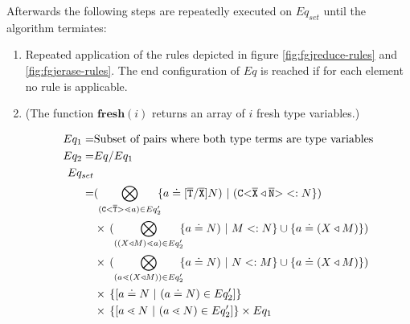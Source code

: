 \documentclass[runningheads]{llncs}
\begin{document}
Afterwards the following steps are repeatedly executed on $Eq_{set}$ until the algorithm termiates:

\begin{enumerate}
\item Repeated application of the rules depicted in figure \ref{fig:fgjreduce-rules} and \ref{fig:fgjerase-rules}.
The end configuration of $Eq$ is reached if for each element
no rule is applicable.

\item
(The function $\textbf{fresh}(i)$ returns an array of $i$ fresh type variables.)

\begin{align*}
Eq_1 =& \text{Subset of pairs where both type terms are type variables}\\
Eq_2 =& Eq / Eq_1 \\
Eq_{set}\\ 
    = 
    & %
    (\displaystyle{\bigotimes_{(\exptype{C}{\overline{T}} \lessdot a) \in Eq'_2}}\!\!
    \set{a \doteq [\ol{T}/\ol{X}]N ) \ | \ (\exptype{C}{\overline{X} \triangleleft \ol{N}} <: N})\\
    & \times\, 
      (\displaystyle{\bigotimes_{((X \triangleleft M)\lessdot a) \in Eq'_2}}\!\!
      \set{a \doteq N ) \ | \ M <: N } \cup \set{a \doteq (X \triangleleft M)})\\
    & \times\, 
      (\displaystyle{\bigotimes_{(a \lessdot (X \triangleleft M)) \in Eq'_2}}\!\!
      \set{a \doteq N ) \ | \ N <: M } \cup \set{a \doteq (X \triangleleft M)})\\
      & \times\, \set{[a \doteq N \ | \  (a \doteq N) \in Eq'_2]} \\
      & \times\, \set{[a \lessdot N \ | \  (a \lessdot N) \in Eq'_2]} \times Eq_1 \\
\end{align*}


\end{enumerate}
\end{document}
